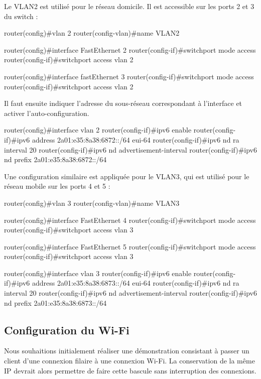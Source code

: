 Le VLAN2 est utilisé pour le réseau domicile.
Il est accessible sur les ports 2 et 3 du switch :

\begin{code}
router(config)#vlan 2
router(config-vlan)#name VLAN2

router(config)#interface FastEthernet 2
router(config-if)#switchport mode access
router(config-if)#switchport access vlan 2

router(config)#interface fastEthernet 3
router(config-if)#switchport mode access
router(config-if)#switchport access vlan 2
\end{code}

Il faut ensuite indiquer l'adresse du sous-réseau correspondant à l'interface et activer l'auto-configuration.

\begin{code}
router(config)#interface vlan 2
router(config-if)#ipv6 enable                              
router(config-if)#ipv6 address 2a01:e35:8a38:6872::/64 eui-64
router(config-if)#ipv6 nd ra interval 20
router(config-if)#ipv6 nd advertisement-interval
router(config-if)#ipv6 nd prefix 2a01:e35:8a38:6872::/64
\end{code}

Une configuration similaire est appliquée pour le VLAN3, qui est utilisé pour le réseau mobile sur les ports 4 et 5 :

\begin{code}
router(config)#vlan 3
router(config-vlan)#name VLAN3

router(config)#interface FastEthernet 4
router(config-if)#switchport mode access
router(config-if)#switchport access vlan 3

router(config)#interface FastEthernet 5
router(config-if)#switchport mode access
router(config-if)#switchport access vlan 3

router(config)#interface vlan 3
router(config-if)#ipv6 enable       
router(config-if)#ipv6 address 2a01:e35:8a38:6873::/64 eui-64
router(config-if)#ipv6 nd ra interval 20
router(config-if)#ipv6 nd advertisement-interval
router(config-if)#ipv6 nd prefix 2a01:e35:8a38:6873::/64
\end{code}

\subsection{Configuration du Wi-Fi}

Nous souhaitions initialement réaliser une démonstration consistant à passer un client d'une connexion filaire à une connexion Wi-Fi.
La conservation de la même IP devrait alors permettre de faire cette bascule sans interruption des connexions.

